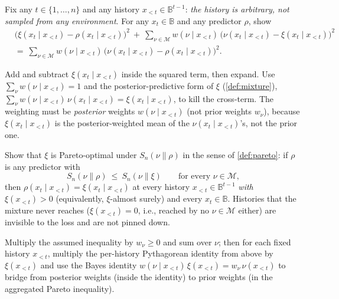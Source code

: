 \documentclass[fontsize=11pt, parskip=half]{scrartcl}
\newcommand{\Mc}{\mathcal{M}}
\newcommand{\Sn}[2]{S_{n}(#1 \parallel #2)}
\begin{document}
\begin{exercise}
\label{prob:sq_pythag}



Fix any $t \in \{1, \dots, n\}$ and any history $x_{<t} \in \mathbb{B}^{t-1}$:
\emph{the history is arbitrary, not sampled from any environment}. For any
$x_t \in \mathbb{B}$ and any predictor $\rho$, show
\begin{align*}
  &\bigl(\xi(x_t \mid x_{<t}) - \rho(x_t \mid x_{<t})\bigr)^{2}
  ~+~
  \sum_{\nu \in \Mc} w(\nu \mid x_{<t})\,\bigl(\nu(x_t \mid x_{<t}) - \xi(x_t \mid x_{<t})\bigr)^{2} \\
  &=~
  \sum_{\nu \in \Mc} w(\nu \mid x_{<t})\,\bigl(\nu(x_t \mid x_{<t}) - \rho(x_t \mid x_{<t})\bigr)^{2}.
\end{align*}

\begin{hint}
Add and subtract $\xi(x_t \mid x_{<t})$ inside the squared term,
then expand. Use $\sum_\nu w(\nu \mid x_{<t}) = 1$ and the posterior-predictive
form of $\xi$ (\cref{def:mixture}), $\sum_\nu w(\nu \mid x_{<t})\,\nu(x_t \mid x_{<t})
= \xi(x_t \mid x_{<t})$, to kill the cross-term. The weighting must be
\emph{posterior} weights $w(\nu \mid x_{<t})$ (not prior weights $w_\nu$),
because $\xi(x_t \mid x_{<t})$ is the posterior-weighted mean of the
$\nu(x_t \mid x_{<t})$'s, not the prior one.
\end{hint}
\end{exercise}


\begin{exercise}
\label{prob:sq_pareto}



Show that $\xi$ is Pareto-optimal under $\Sn{\nu}{\rho}$ in the sense of \cref{def:pareto}: if $\rho$ is any predictor with
\[
  \Sn{\nu}{\rho} ~\leq~ \Sn{\nu}{\xi} \qquad \text{for every } \nu \in \Mc,
\]
then $\rho(x_t \mid x_{<t}) = \xi(x_t \mid x_{<t})$ at every history $x_{<t} \in
\mathbb{B}^{t-1}$ \emph{with $\xi(x_{<t}) > 0$} (equivalently, $\xi$-almost
surely) and every $x_t \in \mathbb{B}$. Histories that the mixture never reaches
($\xi(x_{<t}) = 0$, i.e., reached by no $\nu \in \Mc$ either) are invisible
to the loss and are not pinned down.

\begin{hint}
Multiply the assumed inequality by $w_\nu \geq 0$ and sum over
$\nu$; then for each fixed history $x_{<t}$, multiply the per-history
Pythagorean identity from above by $\xi(x_{<t})$ and use the Bayes identity
$w(\nu \mid x_{<t})\,\xi(x_{<t}) = w_\nu \,\nu(x_{<t})$ to bridge from posterior
weights (inside the identity) to prior weights (in the aggregated Pareto
inequality).
\end{hint}
\end{exercise}
\end{document}
